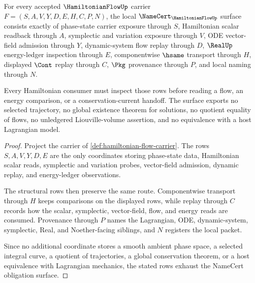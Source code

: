 \begin{theorem}
\label{thm:hamiltonian-flow-namecert-obligation-surface}
For every accepted $\HamiltonianFlowUp$ carrier $F=(S,A,V,Y,D,E,H,C,P,N)$, the local $\NameCert_{\HamiltonianFlowUp}$ surface consists exactly of phase-state carrier exposure through $S$, Hamiltonian scalar readback through $A$, symplectic and variation exposure through $V$, ODE vector-field admission through $Y$, dynamic-system flow replay through $D$, $\RealUp$ energy-ledger inspection through $E$, componentwise $\hsame$ transport through $H$, displayed $\Cont$ replay through $C$, $\Pkg$ provenance through $P$, and local naming through $N$.

Every Hamiltonian consumer must inspect those rows before reading a flow, an energy comparison, or a conservation-current handoff. The surface exports no selected trajectory, no global existence theorem for solutions, no quotient equality of flows, no unledgered Liouville-volume assertion, and no equivalence with a host Lagrangian model.
\end{theorem}
\begin{proof}
Project the carrier of \autoref{def:hamiltonian-flow-carrier}. The rows $S,A,V,Y,D,E$ are the only coordinates storing phase-state data, Hamiltonian scalar reads, symplectic and variation probes, vector-field admission, dynamic replay, and energy-ledger observations.

The structural rows then preserve the same route. Componentwise transport through $H$ keeps comparisons on the displayed rows, while replay through $C$ records how the scalar, symplectic, vector-field, flow, and energy reads are consumed. Provenance through $P$ names the Lagrangian, ODE, dynamic-system, symplectic, Real, and Noether-facing siblings, and $N$ registers the local packet.

Since no additional coordinate stores a smooth ambient phase space, a selected integral curve, a quotient of trajectories, a global conservation theorem, or a host equivalence with Lagrangian mechanics, the stated rows exhaust the NameCert obligation surface.
\end{proof}


